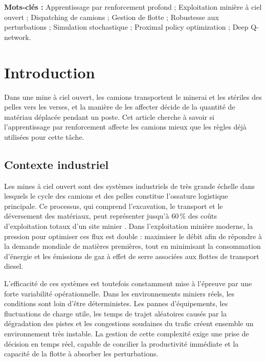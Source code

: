 \documentclass[11pt,a4paper]{article}
\newif\ifrevmarks
\newcommand{\revtag}[1]{\ifrevmarks\textsuperscript{\textcolor{red!70!black}{\scriptsize[#1]}}\fi}
\newcommand{\rev}[2]{\ifrevmarks{\color{revcolor}#2}\revtag{#1}\else#2\fi}
\newif\ifcorrmarks
\newcommand{\corr}[1]{\ifcorrmarks\textcolor{corrcolor}{#1}\else#1\fi}
\begin{document}
\noindent\textbf{Mots-clés :} \rev{m1}{Apprentissage par renforcement profond ; Exploitation minière à ciel ouvert ; Dispatching de camions ; Gestion de flotte ; \corr{Robustesse aux perturbations} ; Simulation stochastique ; Proximal policy optimization ; Deep Q-network.}

\section{Introduction}
\label{sec:intro}

\corr{Dans une mine à ciel ouvert, les camions transportent le minerai et les stériles des pelles vers les verses, et la manière de les affecter décide de la quantité de matériau déplacée pendant un poste. Cet article cherche à savoir si l'apprentissage par renforcement affecte les camions mieux que les règles déjà utilisées pour cette tâche.}

\subsection{Contexte industriel}

Les mines à ciel ouvert sont des systèmes industriels de très grande échelle dans lesquels le cycle des camions et des pelles constitue l'ossature logistique principale. \corr{Ce processus, qui comprend l'excavation, le transport et le déversement des matériaux, peut représenter jusqu'à 60\,\% des coûts d'exploitation totaux d'un site minier} \cite{Afrapoli2017}. Dans l'exploitation minière moderne, la pression pour optimiser ces flux est double : maximiser le débit afin de répondre à la demande mondiale de matières premières, tout en minimisant la consommation d'énergie et les émissions de gaz à effet de serre associées aux flottes de transport diesel.

L'efficacité de ces systèmes est toutefois constamment mise à l'épreuve par une forte variabilité opérationnelle. Dans les environnements miniers réels, les conditions sont loin d'être déterministes. Les pannes d'équipements, les fluctuations de charge utile, les temps de trajet aléatoires causés par la dégradation des pistes et les congestions soudaines du trafic créent ensemble un environnement très instable. La gestion de cette complexité exige une prise de décision en temps réel, capable de concilier la productivité immédiate et \corr{la capacité de la flotte à absorber les perturbations}.
\end{document}
